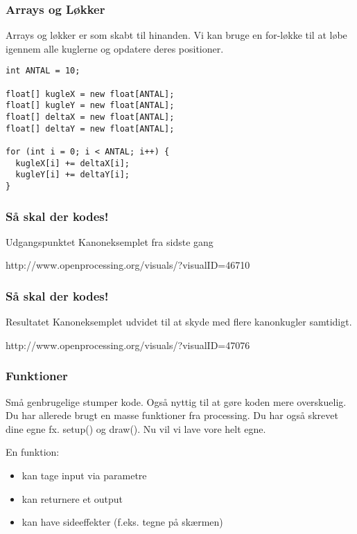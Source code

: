 \documentclass{beamer}
\begin{document}
\begin{frame}[fragile]
  \frametitle{Arrays og Løkker}
  
  Arrays og løkker er som skabt til hinanden. Vi kan bruge en for-løkke til 
  at løbe igennem alle kuglerne og opdatere deres positioner.

\begin{verbatim}
int ANTAL = 10;

float[] kugleX = new float[ANTAL];
float[] kugleY = new float[ANTAL];
float[] deltaX = new float[ANTAL];
float[] deltaY = new float[ANTAL];

for (int i = 0; i < ANTAL; i++) {
  kugleX[i] += deltaX[i];
  kugleY[i] += deltaY[i];
}
\end{verbatim}
  
   
\end{frame}

\begin{frame}[fragile]
  \frametitle{Så skal der kodes!}
  
  \begin{block}{Udgangspunktet}
  Kanoneksemplet fra sidste gang
  
  http://www.openprocessing.org/visuals/?visualID=46710
  \end{block}
    
\end{frame}


\begin{frame}[fragile]
  \frametitle{Så skal der kodes!}
      
  \begin{block}{Resultatet}
  Kanoneksemplet udvidet til at skyde med flere kanonkugler samtidigt.
  
  http://www.openprocessing.org/visuals/?visualID=47076
  \end{block}

\end{frame}


\begin{frame}[fragile]
  \frametitle{Funktioner}
  
  Små genbrugelige stumper kode. Også nyttig til at gøre koden mere overskuelig.\\
  \vspace{0.5cm}
  Du har allerede brugt en masse funktioner fra processing. Du har også skrevet dine egne fx. setup() og draw(). Nu vil vi lave vore helt egne.
  
  \begin{block}{En funktion:} 
  \begin{itemize}
  \item kan tage input via parametre
  \item kan returnere et output
  \item kan have sideeffekter (f.eks. tegne på skærmen)
  \end{itemize}
  \end{block}

\end{frame}
\end{document}
